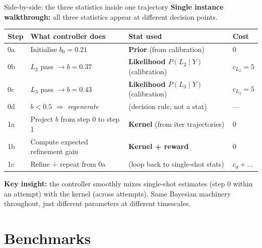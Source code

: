 \documentclass[10pt]{beamer}
\newcommand{\good}[1]{\textcolor{accentGreen}{\textbf{#1}}}
\newcommand{\info}[1]{\textcolor{primaryBlue}{\textbf{#1}}}
\begin{document}
\begin{frame}{Side-by-side: the three statistics inside one trajectory}
\vspace{0.1cm}
\textbf{Single instance walkthrough:} all three statistics appear at different
decision points.

\begin{table}
\centering
\small
\begin{tabular}{p{1.0cm}p{4.0cm}p{4.5cm}p{1.5cm}}
\toprule
\rowcolor{paleBlue}\textbf{Step} & \textbf{What controller does} & \textbf{Stat used} & \textbf{Cost} \\
\midrule
\rowcolor{paleGreen}0a & Initialise $b_0 = 0.21$ &
\info{Prior} (from calibration) & 0 \\
\rowcolor{paleGreen}0b & $L_2$ pass $\to b = 0.37$ &
\info{Likelihood $P(L_2\mid Y)$} (calibration) & $c_{L_2} = 5$ \\
\rowcolor{paleGreen}0c & $L_3$ pass $\to b = 0.43$ &
\info{Likelihood $P(L_3\mid Y)$} (calibration) & $c_{L_3} = 5$ \\
\rowcolor{paleOrange}0d & $b < 0.5$ $\Rightarrow$ \emph{regenerate} &
(decision rule, not a stat) & --- \\
\rowcolor{paleRed}1a & Project $b$ from step 0 to step 1 &
\good{Kernel} (from iter trajectories) & 0 \\
\rowcolor{paleRed}1b & Compute expected refinement gain &
\good{Kernel + reward} & 0 \\
\rowcolor{paleRed}1c & Refine + repeat from 0a &
(loop back to single-shot stats) & $c_g + ...$ \\
\bottomrule
\end{tabular}
\end{table}

\vspace{0.15cm}
\good{Key insight:} the controller smoothly mixes single-shot estimates
(step 0 within an attempt) with the kernel (across attempts). Same Bayesian
machinery throughout, just different parameters at different timescales.
\end{frame}


\section{Benchmarks}
\hypertarget{out:6}{}
\end{document}
